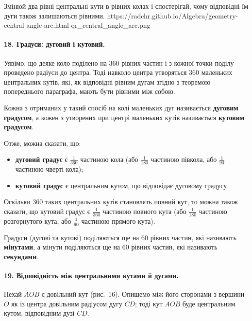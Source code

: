 %
{Змінюй два рівні центральні кути в рівних колах і спостерігай, чому відповідні їм дуги також залишаються рівними.}%
{https://radchr.github.io/Algebra/geometry-central-angle-arc.html}%
{qr_central_angle_arc.png}

\paragraph{18. Градуси: дуговий і кутовий.}
Уявімо, що деяке коло поділено на 360 рівних частин і з кожної точки поділу проведено радіуси до центра. Тоді навколо центра утворяться 360 маленьких центральних кутів, які, як відповідні рівним дугам згідно з теоремою попереднього параграфа, мають бути рівними між собою.

Кожна з отриманих у такий спосіб на колі маленьких дуг називається \textbf{дуговим градусом}, а кожен з утворених при центрі маленьких кутів називається \textbf{кутовим градусом}.

Отже, можна сказати, що:
\begin{itemize}
    \item \textbf{дуговий градус} є $\frac{1}{360}$ частиною кола (або $\frac{1}{180}$ частиною півкола, або $\frac{1}{90}$ частиною чверті кола);
    \item \textbf{кутовий градус} є центральним кутом, що відповідає дуговому градусу.
\end{itemize}

Оскільки 360 таких центральних кутів становлять повний кут, то можна також сказати, що кутовий градус є $\frac{1}{360}$ частиною повного кута (або $\frac{1}{180}$ частиною розгорнутого кута, або $\frac{1}{90}$ частиною прямого кута).

Градуси (дугові та кутові) поділяються ще на 60 рівних частин, які називають \textbf{мінутами}, а мінути поділяються ще на 60 рівних частин, які називають \textbf{секундами}.

\paragraph{19. Відповідність між центральними кутами й дугами.}
Нехай $AOB$ є довільний кут (рис.~16). Опишемо між його сторонами з вершини $O$ як із центра довільним радіусом дугу $CD$; тоді кут $AOB$ буде центральним кутом, відповідним дузі $CD$.

\begin{center}
\end{center}

